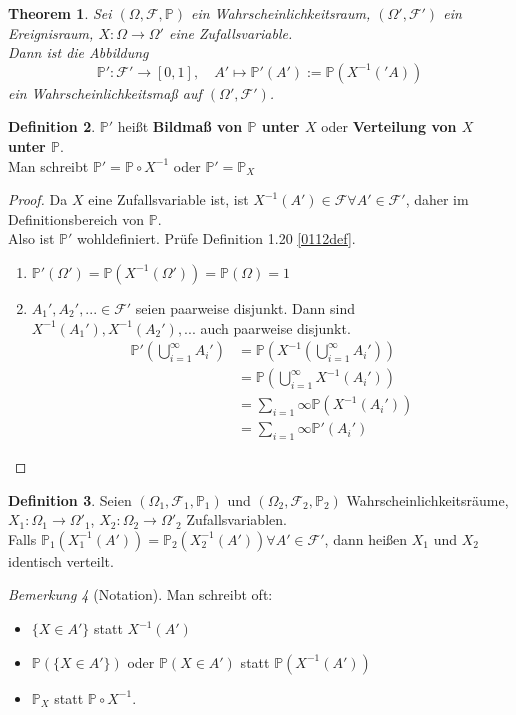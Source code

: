\documentclass[10pt,a4paper]{article}
\newcommand{\Prb}{\mathbb P}
\newcommand{\scF}{\ensuremath{\mathscr{F}}}
\theoremstyle{plain}
\newtheorem{theorem}{Theorem}[section]
\theoremstyle{definition}
\newtheorem{definition}[theorem]{Definition}
\theoremstyle{remark}
\newtheorem{bem}[theorem]{Bemerkung}
\begin{document}
	\begin{theorem}
		Sei $(\Omega,\scF,\Prb)$ ein Wahrscheinlichkeitsraum, $(\Omega',\scF')$ ein Ereignisraum, $X:\Omega\to\Omega'$ eine Zufallsvariable.\\
		Dann ist die Abbildung
		\[\Prb':\scF'\to[0,1],\quad A'\mapsto\Prb'(A'):=\Prb(X^{-1}('A))\] 
		ein Wahrscheinlichkeitsmaß auf $(\Omega',\scF')$.  
	\end{theorem}
	\addtocounter{subsection}{-1}
	\begin{definition}
		$\Prb'$ heißt \textbf{Bildmaß von $\Prb$ unter $X$} oder \textbf{Verteilung von $X$ unter $\Prb$}.\\
		Man schreibt $\Prb'=\Prb\circ X^{-1}$ oder $\Prb'=\Prb_X$
	\end{definition}
	\begin{proof}
		Da $X$ eine Zufallsvariable ist, ist $X^{-1}(A')\in\scF\forall A'\in\scF'$, daher im Definitionsbereich von $\Prb$.\\
		Also ist $\Prb'$ wohldefiniert. Prüfe Definition 1.20 \ref{0112def}.
		\begin{enumerate}[label=\alph*)]
			\item $\Prb'(\Omega')=\Prb(X^{-1}(\Omega'))=\Prb(\Omega)=1$
			\item $A_1',A_2',...\in \scF'$ seien paarweise disjunkt. Dann sind $X^{-1}(A_1'),X^{-1}(A_2'),...$ auch paarweise disjunkt.
			\begin{align*}
			\Prb'\left(\bigcup_{i=1}^\infty A_i'\right)&=\Prb\left( X^{-1}\left(\bigcup_{i=1}^\infty A_i'\right)\right)\\
			&=\Prb\left(\bigcup_{i=1}^\infty X^{-1}(A_i')\right)\\
			&=\sum_{i=1}\infty\Prb(X^{-1}(A_i'))\\
			&=\sum_{i=1}\infty\Prb'(A_i')
			\end{align*}
		\end{enumerate}
	\end{proof}

	\begin{definition}
		Seien $(\Omega_1,\scF_1,\Prb_1)$ und $(\Omega_2,\scF_2,\Prb_2)$ Wahrscheinlichkeitsräume, $X_1:\Omega_1\to\Omega'_1$, $X_2:\Omega_2\to\Omega'_2$ Zufallsvariablen.\\
		Falls $\Prb_1(X^{-1}_1(A'))=\Prb_2(X_2^{-1}(A'))\forall A'\in\scF'$, dann heißen $X_1$ und $X_2$ identisch verteilt.
	\end{definition}

	\begin{bem}[Notation]
		Man schreibt oft:
		\begin{itemize}
			\item $\{X\in A'\}$ statt $X^{-1}(A')$
			\item $\Prb(\{X\in A'\})$ oder $\Prb(X\in A')$ statt $\Prb(X^{-1}(A'))$
			\item $\Prb_X$ statt $\Prb\circ X^{-1}$.
		\end{itemize}
	\end{bem}
\end{document}
